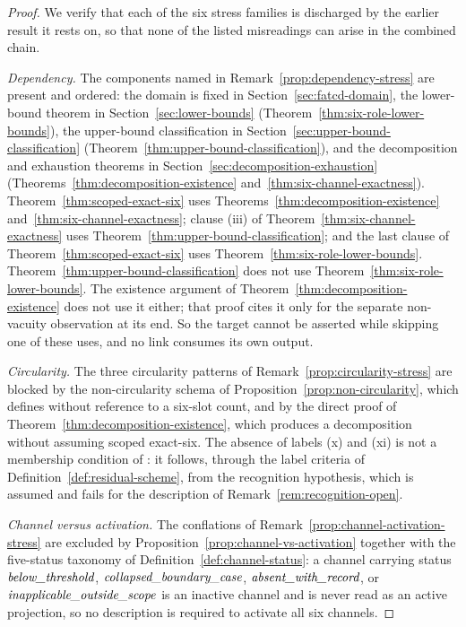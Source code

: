 \begin{proof}
We verify that each of the six stress families is discharged by the earlier
result it rests on, so that none of the listed misreadings can arise in
the combined chain.

\emph{Dependency.} The components named in
Remark~\ref{prop:dependency-stress} are present and ordered: the
\FATCD{} domain is fixed in Section~\ref{sec:fatcd-domain}, the
lower-bound theorem in Section~\ref{sec:lower-bounds}
(Theorem~\ref{thm:six-role-lower-bounds}), the upper-bound
classification in Section~\ref{sec:upper-bound-classification}
(Theorem~\ref{thm:upper-bound-classification}), and the
decomposition and exhaustion theorems in
Section~\ref{sec:decomposition-exhaustion}
(Theorems~\ref{thm:decomposition-existence}
and~\ref{thm:six-channel-exactness}). Theorem~\ref{thm:scoped-exact-six}
uses Theorems~\ref{thm:decomposition-existence}
and~\ref{thm:six-channel-exactness}; clause (iii) of
Theorem~\ref{thm:six-channel-exactness} uses
Theorem~\ref{thm:upper-bound-classification}; and the last clause of
Theorem~\ref{thm:scoped-exact-six} uses
Theorem~\ref{thm:six-role-lower-bounds}. Theorem~\ref{thm:upper-bound-classification} does not use
Theorem~\ref{thm:six-role-lower-bounds}. The existence argument of
Theorem~\ref{thm:decomposition-existence} does not use it either; that proof
cites it only for the separate non-vacuity observation at its end. So the target cannot be asserted
while skipping one of these uses, and no link consumes its own output.

\emph{Circularity.} The three circularity patterns of
Remark~\ref{prop:circularity-stress} are blocked by the
non-circularity schema of Proposition~\ref{prop:non-circularity}, which
defines \FATCD{} without reference to a six-slot count, and by the
direct proof of Theorem~\ref{thm:decomposition-existence}, which
produces a decomposition without assuming scoped exact-six. The absence of
labels (x) and (xi) is not a membership condition of \FATCD{}: it follows,
through the label criteria of Definition~\ref{def:residual-scheme}, from the
recognition hypothesis, which is assumed and fails for the description of
Remark~\ref{rem:recognition-open}.

\emph{Channel versus activation.} The conflations of
Remark~\ref{prop:channel-activation-stress} are excluded by
Proposition~\ref{prop:channel-vs-activation} together with the
five-status taxonomy of Definition~\ref{def:channel-status}: a channel
carrying status \(\textit{below\_\allowbreak threshold}\), \(\textit{collapsed\_\allowbreak boundary\_\allowbreak case}\), \(\textit{absent\_\allowbreak with\_\allowbreak record}\), or
\(\textit{inapplicable\_\allowbreak outside\_\allowbreak scope}\) is an inactive channel and is never read as an active
projection, so no description is required to activate all six channels.


\end{proof}

